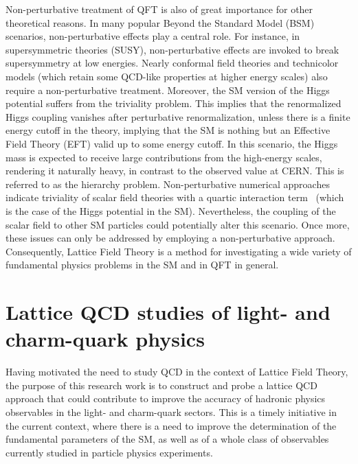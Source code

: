 Non-perturbative treatment of QFT is also of great importance for other theoretical reasons. In many popular Beyond the Standard Model (BSM) scenarios, non-perturbative effects play a central role. For instance, in supersymmetric theories (SUSY), non-perturbative effects are invoked to break supersymmetry at low energies. Nearly conformal field theories and technicolor models (which retain some QCD-like properties at higher energy scales) also require a non-perturbative treatment.  Moreover, the SM version of the Higgs potential suffers from the triviality problem. This implies that the renormalized Higgs coupling vanishes after perturbative renormalization, unless there is a finite energy cutoff in the theory, implying that the SM is nothing but an Effective Field Theory (EFT) valid up to some energy cutoff. In this scenario, the Higgs mass is expected to receive large contributions from the high-energy scales, rendering it naturally heavy, in contrast to the observed value at CERN. This is referred to as the hierarchy problem. Non-perturbative numerical approaches indicate triviality of scalar field theories with a quartic interaction term~\citep{Luscher:1987ek} (which is the case of the Higgs potential in the SM). Nevertheless, the coupling of the scalar field to other SM particles could potentially alter this scenario. Once more, these issues can only be addressed by employing a non-perturbative approach. Consequently, Lattice Field Theory is a method for investigating a wide variety of fundamental physics problems in the SM and in QFT in general.

\section*{Lattice QCD studies of light- and charm-quark physics}

Having motivated the need to study QCD in the context of Lattice Field Theory, the purpose of this research work is to construct and probe a lattice QCD approach that could contribute to improve the accuracy  of hadronic physics observables in the light- and charm-quark sectors. This is a timely initiative in the current context, where there is a need to improve the determination of the fundamental parameters of the SM, as well as of a whole class of observables currently studied in particle physics experiments. 

